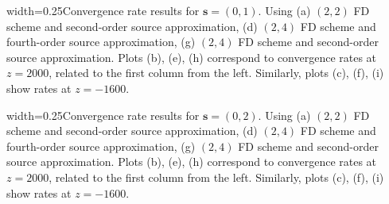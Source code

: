 {width=0.25\textwidth}{Convergence rate results for ${\mathbf s}=(0,1)$. Using (a) $(2,2)$ FD scheme and second-order source approximation, (d) $(2,4)$ FD scheme and fourth-order source approximation, (g) $(2,4)$ FD scheme and second-order source approximation. Plots (b), (e), (h) correspond to convergence rates at $z=2000$, related to the first column from the left. Similarly, plots (c), (f), (i) show rates at $z=-1600$.}

{width=0.25\textwidth}{Convergence rate results for ${\mathbf s}=(0,2)$. Using (a) $(2,2)$ FD scheme and second-order source approximation, (d) $(2,4)$ FD scheme and fourth-order source approximation, (g) $(2,4)$ FD scheme and second-order source approximation. Plots (b), (e), (h) correspond to convergence rates at $z=2000$, related to the first column from the left. Similarly, plots (c), (f), (i) show rates at $z=-1600$.}





